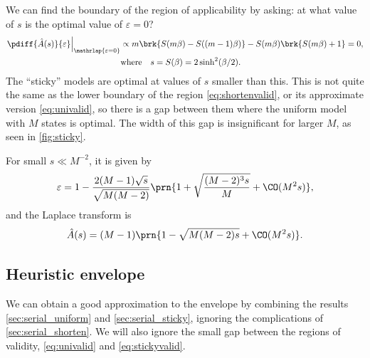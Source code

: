 \documentclass[12pt]{article}
\begin{document}
We can find the boundary of the region of applicability by asking: at what value of \(s\) is the optimal value of \(\varepsilon=0\)?
%
\begin{equation}\label{eq:stickyvalid}
\begin{aligned}
  \left.\pdiff{\hat{A}(s)}{\varepsilon}\right|_{\mathrlap{\varepsilon=0}} &\propto
    m \brk{S(m\beta) - S((m-1)\beta)} - S(m\beta) \brk{S(m\beta) + 1} = 0,\\
   &\text{where} \quad s =  S(\beta) = 2 \sinh^2(\beta/2).
\end{aligned}
\end{equation}
%
The ``sticky'' models are optimal at values of \(s\) smaller than this.
This is not quite the same as the lower boundary of the region \cref{eq:shortenvalid}, or its approximate version \cref{eq:univalid}, so there is a gap between them where the uniform model with \(M\) states is optimal.
The width of this gap is insignificant for larger \(M\), as seen in \cref{fig:sticky}.

For small \(s \ll M^{-2}\), it is given by
%
\begin{equation}\label{eq:stickyeps}
  \varepsilon = 1 - \frac{ 2(M-1)\sqrt{s} }{\sqrt{M(M-2)}} 
    \prn{ 1 + \sqrt{\frac{(M-2)^3s}{M}} + \CO(M^2s)},
\end{equation}
%
and the Laplace transform is
%
\begin{equation}\label{eq:stickyenv}
  \hat{A}(s) = (M-1) \prn{ 1 - \sqrt{M(M-2)s} + \CO(M^2s)}.
\end{equation}
%


\subsection{Heuristic envelope}\label{sec:heuristicenv}


We can obtain a good approximation to the envelope by combining the results \cref{sec:serial_uniform} and \cref{sec:serial_sticky}, ignoring the complications of \cref{sec:serial_shorten}.
We will also ignore the small gap between the regions of validity, \eqref{eq:univalid} and \eqref{eq:stickyvalid}.
\end{document}
